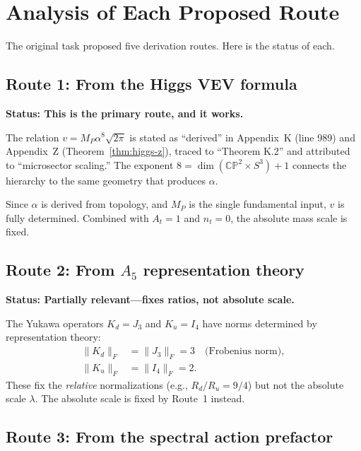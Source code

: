 \documentclass[11pt,a4paper]{article}
\newcommand{\CP}{\mathbb{CP}}
\theoremstyle{definition}
\theoremstyle{remark}
\begin{document}
\section{Analysis of Each Proposed Route}
\label{sec:routes}

The original task proposed five derivation routes. Here is the status of each.

\subsection{Route 1: From the Higgs VEV formula}

\textbf{Status: This is the primary route, and it works.}

The relation $v = M_P\alpha^8\sqrt{2\pi}$ is stated as ``derived'' in
Appendix~K (line 989) and Appendix~Z (Theorem~\ref{thm:higgs-z}), traced
to ``Theorem K.2'' and attributed to ``microsector scaling.'' The exponent
$8 = \dim(\CP^2\times S^3) + 1$ connects the hierarchy to the same
geometry that produces $\alpha$.

Since $\alpha$ is derived from topology, and $M_P$ is the single
fundamental input, $v$ is fully determined. Combined with $A_t = 1$
and $n_t = 0$, the absolute mass scale is fixed.

\subsection{Route 2: From $A_5$ representation theory}

\textbf{Status: Partially relevant---fixes ratios, not absolute scale.}

The Yukawa operators $K_d = J_3$ and $K_u = I_4$ have norms determined
by representation theory:
\begin{align}
\|K_d\|_F &= \|J_3\|_F = 3 \quad \text{(Frobenius norm)}, \\
\|K_u\|_F &= \|I_4\|_F = 2.
\end{align}
These fix the \emph{relative} normalizations (e.g., $R_d/R_u = 9/4$)
but not the absolute scale $\lambda$. The absolute scale is fixed by
Route~1 instead.

\subsection{Route 3: From the spectral action prefactor}
\end{document}
